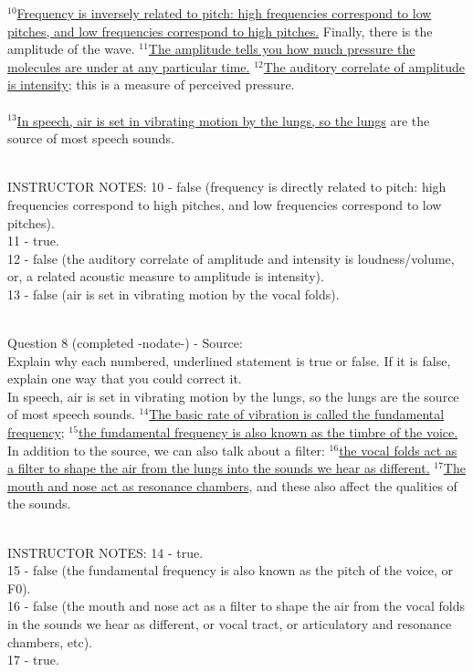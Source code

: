 \documentclass[12pt]{article}
\begin{document}
$^{10}$\ul{Frequency is inversely related to pitch: high frequencies correspond to low pitches, and low frequencies correspond to high pitches.} Finally, there is the amplitude of the wave. $^{11}$\ul{The amplitude tells you how much pressure the molecules are under at any particular time.} $^{12}$\ul{The auditory correlate of amplitude is intensity}; this is a measure of perceived pressure.\\\\$^{13}$\ul{In speech, air is set in vibrating motion by the lungs, so the lungs} are the source of most speech sounds.


~\\
INSTRUCTOR NOTES: 10 - false (frequency is directly related to pitch: high frequencies correspond to high pitches, and low frequencies correspond to low pitches).\\11 - true.\\12 - false (the auditory correlate of amplitude and intensity is loudness/volume, or, a related acoustic measure to amplitude is intensity).\\13 - false (air is set in vibrating motion by the vocal folds).


~\\

{\large Question 8} (completed -nodate-) - Source: \\

Explain why each numbered, underlined statement is true or false. If it is false, explain one way that you could correct it.\\

In speech, air is set in vibrating motion by the lungs, so the lungs are the source of most speech sounds. $^{14}$\ul{The basic rate of vibration is called the fundamental frequency}; $^{15}$\ul{the fundamental frequency is also known as the timbre of the voice.} In addition to the source, we can also talk about a filter: $^{16}$\ul{the vocal folds act as a filter to shape the air from the lungs into the sounds we hear as different.} $^{17}$\ul{The mouth and nose act as resonance chambers}, and these also affect the qualities of the sounds.


~\\
INSTRUCTOR NOTES: 14 - true.\\15 - false (the fundamental frequency is also known as the pitch of the voice, or F0).\\16 - false (the mouth and nose act as a filter to shape the air from the vocal folds in the sounds we hear as different, or vocal tract, or articulatory and resonance chambers, etc).\\17 - true.
\end{document}

